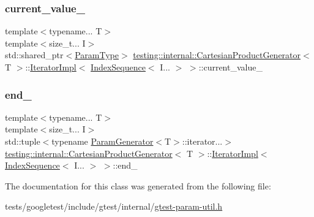 \subsubsection{\texorpdfstring{current\+\_\+value\+\_\+}{current\_value\_}}
{\footnotesize\ttfamily template$<$typename... T$>$ \\
template$<$size\+\_\+t... I$>$ \\
std\+::shared\+\_\+ptr$<$\hyperlink{classtesting_1_1internal_1_1CartesianProductGenerator_af27131157a9347f0c82420ca081ee7dd}{Param\+Type}$>$ \hyperlink{classtesting_1_1internal_1_1CartesianProductGenerator}{testing\+::internal\+::\+Cartesian\+Product\+Generator}$<$ T $>$\+::\hyperlink{classtesting_1_1internal_1_1CartesianProductGenerator_1_1IteratorImpl}{Iterator\+Impl}$<$ \hyperlink{structtesting_1_1internal_1_1IndexSequence}{Index\+Sequence}$<$ I... $>$ $>$\+::current\+\_\+value\+\_\+\hspace{0.3cm}{\ttfamily [private]}}

\mbox{\label{classtesting_1_1internal_1_1CartesianProductGenerator_1_1IteratorImpl_3_01IndexSequence_3_01I_8_8_8_01_4_01_4_aae9ccfd177834224412f9ac194bd8b68}} 
\subsubsection{\texorpdfstring{end\+\_\+}{end\_}}
{\footnotesize\ttfamily template$<$typename... T$>$ \\
template$<$size\+\_\+t... I$>$ \\
std\+::tuple$<$typename \hyperlink{classtesting_1_1internal_1_1ParamGenerator}{Param\+Generator}$<$T$>$\+::iterator...$>$ \hyperlink{classtesting_1_1internal_1_1CartesianProductGenerator}{testing\+::internal\+::\+Cartesian\+Product\+Generator}$<$ T $>$\+::\hyperlink{classtesting_1_1internal_1_1CartesianProductGenerator_1_1IteratorImpl}{Iterator\+Impl}$<$ \hyperlink{structtesting_1_1internal_1_1IndexSequence}{Index\+Sequence}$<$ I... $>$ $>$\+::end\+\_\+\hspace{0.3cm}{\ttfamily [private]}}



The documentation for this class was generated from the following file\+:\begin{DoxyCompactItemize}
\item 
tests/googletest/include/gtest/internal/\hyperlink{gtest-param-util_8h}{gtest-\/param-\/util.\+h}\end{DoxyCompactItemize}
